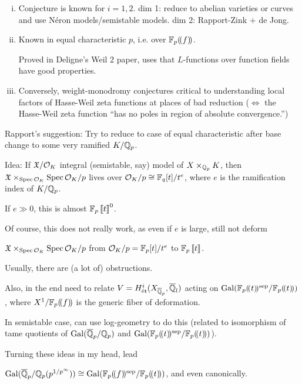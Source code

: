 \begin{rem} \hfill
\begin{enumerate}[(i)]
\item Conjecture is known for $i= 1,2$.
dim 1: reduce to abelian varieties or curves and use N\'eron models/semistable models.
dim 2: Rapport-Zink $+$ de Jong.

\item Known in equal characteristic $p$, i.e. over $\mathbb{F}_p(\!(f)\!)$.

Proved in Deligne's Weil 2 paper, uses that $L$-functions over function fields have good properties.

\item Conversely, weight-monodromy conjectures critical to understanding local factors of Hasse-Weil zeta functions at places of bad reduction ($\Leftrightarrow$ the Hasse-Weil zeta function ``has no poles in region of absolute convergence.'')
\end{enumerate}
\end{rem}


Rapport's suggestion: Try to reduce to case of equal characteristic after base change to some very ramified $K/\mathbb{Q}_p$. 


Idea: If $\mathfrak{X}/\mathcal{O}_K$ integral (semistable, say) model of $X \times_{\mathbb{Q}_p} K$, then $\mathfrak{X} \times_{\operatorname{Spec} \mathcal{O}_K} \operatorname{Spec} \mathcal{O}_K/p$ lives over $\mathcal{O}_K/p \cong \mathbb{F}_q[t]/t^e$, where $e$ is the ramification index of $K/\mathbb{Q}_p$. 

If $e \gg 0$, this is almost $\mathbb{F}_p\left\llbracket t \right\rrbracket^0$. 

Of course, this does not really work, as even if $e$ is large, still not deform

$\mathfrak{X} \times_{\operatorname{Spec} \mathcal{O}_K} \operatorname{Spec} \mathcal{O}_K/p$ from $\mathcal{O}_K/p= \mathbb{F}_p[t]/t^e$ to $\mathbb{F}_p\left\llbracket t \right\rrbracket$.

Usually, there are (a lot of) obstructions.

Also, in the end need to relate $V= H_{\text{\'et}}^i(X_{\overline{\mathbb{Q}}_p}, \overline{\mathbb{Q}}_l)$ acting on $\operatorname{Gal}(\mathbb{F}_p(\!(t)\!)^{\text{sep}}/\mathbb{F}_p(\!(t)\!))$, where $X^1/\mathbb{F}_p(\!(f)\!)$ is the generic fiber of deformation.


In semistable case, can use log-geometry to do this (related to isomorphism of tame quotients of $\operatorname{Gal}(\overline{\mathbb{Q}}_p/\mathbb{Q}_p)$ and $\operatorname{Gal}(\mathbb{F}_p(\!(t)\!)^{\text{sep}}/\mathbb{F}_p(\!(t)\!))$).


Turning these ideas in my head, lead 


\begin{thm}
$\operatorname{Gal}(\overline{\mathbb{Q}}_p/\mathbb{Q}_p(p^{1/p^\infty})) \cong \operatorname{Gal}(\mathbb{F}_p(\!(f)\!)^{\text{sep}}/\mathbb{F}_p(\!(t)\!))$, and even canonically.
\end{thm}

